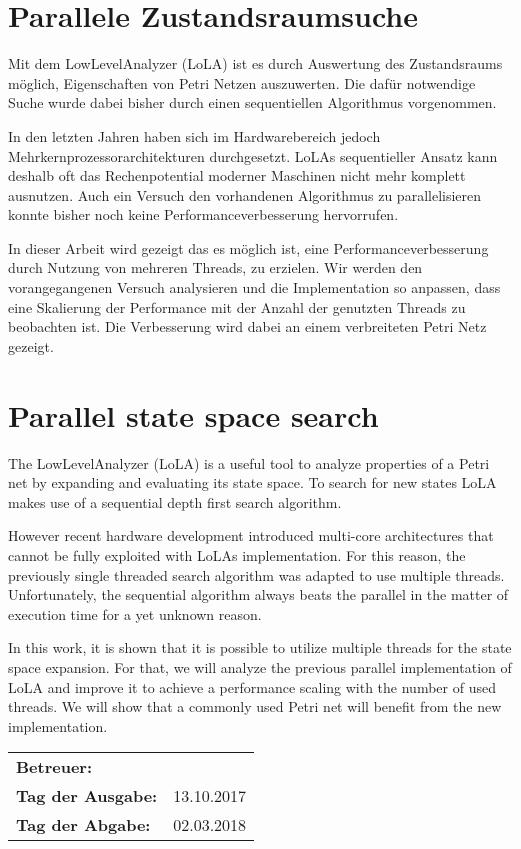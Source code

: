 \section*{Parallele Zustandsraumsuche}
Mit dem LowLevelAnalyzer (LoLA) ist es durch Auswertung des Zustandsraums möglich, Eigenschaften von Petri Netzen auszuwerten. Die dafür notwendige Suche wurde dabei bisher durch einen sequentiellen Algorithmus vorgenommen.

In den letzten Jahren haben sich im Hardwarebereich jedoch Mehrkern\-prozessor\-architekturen durchgesetzt. LoLAs sequentieller Ansatz kann deshalb oft das Rechenpotential moderner Maschinen nicht mehr komplett ausnutzen. Auch ein Versuch den vorhandenen Algorithmus zu parallelisieren konnte bisher noch keine Performanceverbesserung hervorrufen.

In dieser Arbeit wird gezeigt das es möglich ist, eine Performanceverbesserung durch Nutzung von mehreren Threads, zu erzielen. Wir werden den vorangegangenen Versuch analysieren und die Implementation so anpassen, dass eine Skalierung der Performance mit der Anzahl der genutzten Threads zu beobachten ist. Die Verbesserung wird dabei an einem verbreiteten Petri Netz gezeigt.

\section*{Parallel state space search}
The LowLevelAnalyzer (LoLA) is a useful tool to analyze properties of a Petri net by expanding and evaluating its state space. To search for new states LoLA makes use of a sequential depth first search algorithm.

However recent hardware development introduced multi-core architectures that cannot be fully exploited with LoLAs implementation. For this reason, the previously single threaded search algorithm was adapted to use multiple threads. Unfortunately, the sequential algorithm always beats the parallel in the matter of execution time for a yet unknown reason.

In this work, it is shown that it is possible to utilize multiple threads for the state space expansion. For that, we will analyze the previous parallel implementation of LoLA and improve it to achieve a performance scaling with the number of used threads. We will show that a commonly used Petri net will benefit from the new implementation.



\vfill

\begin{tabular}{ll}
	\bfseries Betreuer: & \parbox[t]{10cm}{\betreuer }\vspace{5mm} \\
	\bfseries Tag der Ausgabe: & 13.10.2017 \\
	\bfseries Tag der Abgabe: & 02.03.2018 \\
\end{tabular}